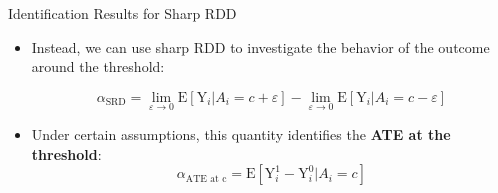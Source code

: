 \documentclass[hyperref={pdfpagelabels=false}]{beamer}
\begin{document}
\begin{frame}{Identification Results for Sharp RDD}{}
	\begin{itemize}
		
		\item Instead, we can use sharp RDD to investigate the behavior of the outcome around the threshold:
		
		\begin{equation*}
		\alpha_{\text{SRD}} = \lim_{\varepsilon\rightarrow 0}\mathrm{E}[\mathrm{Y}_{i}|A_i=c+\varepsilon] - \lim_{\varepsilon\rightarrow 0}\mathrm{E}[\mathrm{Y}_{i}|A_i=c-\varepsilon] 
		\end{equation*}	
		
		
		
		\item Under certain assumptions, this quantity identifies the \textbf{ATE at the threshold}:
		\begin{equation*}
		\alpha_{\text{ATE at c}}=\mathrm{E}[\mathrm{Y}^{1}_{i}-\mathrm{Y}^{0}_{i}|A_i=c]
		\end{equation*}
	\end{itemize}
\end{frame}
\end{document}
